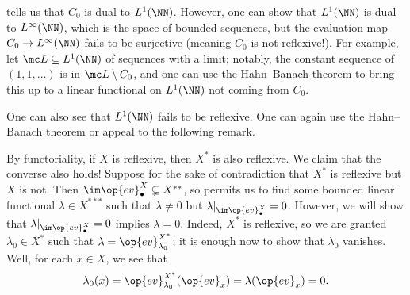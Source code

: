 \documentclass[../notes.tex]{subfiles}
\begin{document}
\begin{nex}
	 tells us that $C_0$ is dual to $L^1(\NN)$. However, one can show that $L^1(\NN)$ is dual to $L^\infty(\NN)$, which is the space of bounded sequences, but the evaluation map $C_0\to L^\infty(\NN)$ fails to be surjective (meaning $C_0$ is not reflexive!). For example, let $\mc L\subseteq L^1(\NN)$ of sequences with a limit; notably, the constant sequence of $(1,1,\ldots)$ is in $\mc L\setminus C_0$, and one can use the Hahn--Banach theorem to bring this up to a linear functional on $L^1(\NN)$ not coming from $C_0$.
\end{nex}
\begin{nex}
	One can also see that $L^1(\NN)$ fails to be reflexive. One can again use the Hahn--Banach theorem or appeal to the following remark.
\end{nex}
\begin{remark}
	By functoriality, if $X$ is reflexive, then $X^*$ is also reflexive. We claim that the converse also holds! Suppose for the sake of contradiction that $X^*$ is reflexive but $X$ is not. Then ${\im\op{ev}^X_\bullet}\subsetneq X^{**}$, so  permits us to find some bounded linear functional $\lambda\in X^{***}$ such that $\lambda\ne0$ but $\lambda|_{\im\op{ev}^X_\bullet}=0$. However, we will show that $\lambda|_{\im\op{ev}^X_\bullet}=0$ implies $\lambda=0$. Indeed, $X^*$ is reflexive, so we are granted $\lambda_0\in X^*$ such that $\lambda=\op{ev}_{\lambda_0}^{X^*}$; it is enough now to show that $\lambda_0$ vanishes. Well, for each $x\in X$, we see that
	\[\lambda_0(x)=\op{ev}_{\lambda_0}^{X^*}({\op{ev}_x})=\lambda({\op{ev}_x})=0.\]
\end{remark}
\end{document}
